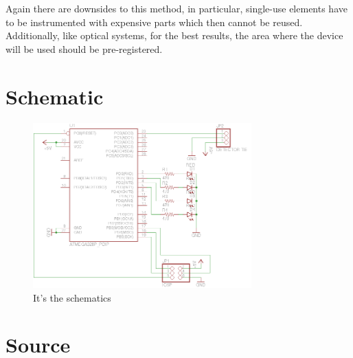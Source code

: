 \documentclass[a4paper]{article}
\begin{document}
            Again there are downsides to this method, in particular, single-use elements have to be instrumented with expensive parts which then cannot be reused. Additionally, like optical systems, for the best results, the area where the device will be used should be pre-registered.

    \section{Schematic}
    \begin{figure}[h]
        \centering
        \includegraphics[width=0.75\textwidth]{images/schematic}
        \caption{It's the schematics}
    \end{figure}

    \section{Source}
    
\end{document}
